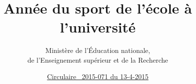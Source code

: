 \documentclass{article}
\title{Année du sport de l’école à l'université}
\author{Ministère de l'Éducation nationale,\\ de l'Enseignement supérieur et de la Recherche}
\date{\href{http://www.education.gouv.fr/pid25535/bulletin_officiel.html?cid_bo=88031}{Circulaire \no{}~2015-071 du 13-4-2015}}
\begin{document}
\maketitle
\renewcommand{\contentsname}{Sommaire}
\tableofcontents

\end{document}
